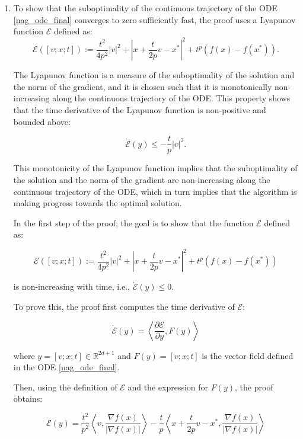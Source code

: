 \begin{enumerate}

    \item To show that the suboptimality of the continuous trajectory of the ODE \eqref{nag_ode_final} converges to zero sufficiently fast, the proof uses a Lyapunov function $\mathcal{E}$ defined as:
          $$
              \mathcal{E}([v ; x ; t]):=\frac{t^{2}}{4 p^{2}}|v|^{2}+\left|x+\frac{t}{2 p} v-x^*{}\right|^{2}+t^{p}\left(f(x)-f\left(x^{*}\right)\right) .
          $$

          The Lyapunov function is a measure of the suboptimality of the solution and the norm of the gradient, and it is chosen such that it is monotonically non-increasing along the continuous trajectory of the ODE. This property shows that the time derivative of the Lyapunov function is non-positive and bounded above:

          $$
              \dot{\mathcal{E}}(y) \leq-\frac{t}{p}|v|^{2} .
          $$

          This monotonicity of the Lyapunov function implies that the suboptimality of the solution and the norm of the gradient are non-increasing along the continuous trajectory of the ODE, which in turn implies that the algorithm is making progress towards the optimal solution.

          In the first step of the proof, the goal is to show that the function $\mathcal{E}$ defined as:

          $$
              \mathcal{E}([v ; x ; t]) := \frac{t^2}{4p^2} |v|^2 + |x + \frac{t}{2p} v - x^*|^2 + t^p (f(x) - f(x^*))
          $$

          is non-increasing with time, i.e., $\dot{\mathcal{E}}(y) \le 0$.

          To prove this, the proof first computes the time derivative of $\mathcal{E}$:

          $$
              \dot{\mathcal{E}}(y) = \left\langle \frac{\partial \mathcal{E}}{\partial y}, F(y) \right\rangle
          $$

          where $y = [v; x; t] \in \mathbb{R}^{2d+1}$ and $F(y) = [v; x; t]$ is the vector field defined in the ODE \eqref{nag_ode_final}.

          Then, using the definition of $\mathcal{E}$ and the expression for $F(y)$, the proof obtains:

          $$
              \dot{\mathcal{E}}(y) = \frac{t^2}{p^2} \left\langle v, \frac{\nabla f(x)}{|\nabla f(x)|} \right\rangle - \frac{t}{p} \left\langle x + \frac{t}{2p} v - x^*, \frac{\nabla f(x)}{|\nabla f(x)|} \right\rangle
          $$


\end{enumerate}
